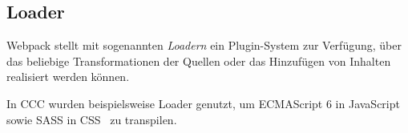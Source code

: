 \subsection{Loader}
\label{sec:gw_loader}

Webpack stellt mit sogenannten \emph{Loadern} ein
Plugin-System zur Verfügung, über das beliebige Transformationen der Quellen
oder das Hinzufügen von Inhalten realisiert werden können.

In CCC wurden beispielsweise Loader genutzt, um ECMAScript 6 in
JavaScript~\cite{babelLoader} sowie SASS in CSS~\cite{sassLoader} zu transpilen.
